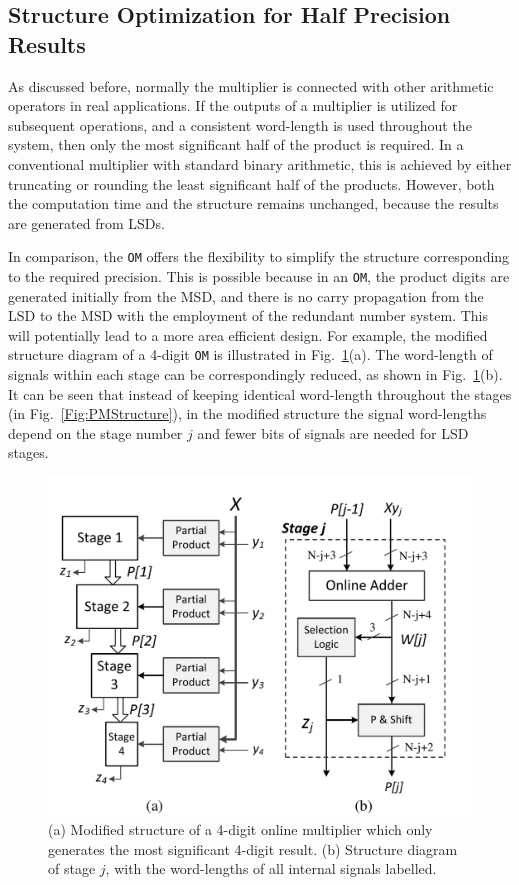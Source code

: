 \documentclass[conference]{IEEEtran}
\begin{document}
\subsection{Structure Optimization for Half Precision Results}
As discussed before, normally the multiplier is connected with other arithmetic operators in real applications. If the outputs of a multiplier is utilized for subsequent operations, and a consistent word-length is used throughout the system, then only the most significant half of the product is required. In a conventional multiplier with standard binary arithmetic, this is achieved by either truncating or rounding the least significant half of the products. However, both the computation time and the structure remains unchanged, because the results are generated from LSDs.

In comparison, the \texttt{OM} offers the flexibility to simplify the structure corresponding to the required precision. This is possible because in an \texttt{OM}, the product digits are generated initially from the MSD, and there is no carry propagation from the LSD to the MSD with the employment of the redundant number system. This will potentially lead to a more area efficient design. For example, the modified structure diagram of a 4-digit \texttt{OM} is illustrated in Fig.~\ref{Fig:PMStructure_MSDhalf}(a). The word-length of signals within each stage can be correspondingly reduced, as shown in Fig.~\ref{Fig:PMStructure_MSDhalf}(b). It can be seen that instead of keeping identical word-length throughout the stages (in Fig.~\ref{Fig:PMStructure}), in the modified structure the signal word-lengths depend on the stage number $j$ and fewer bits of signals are needed for LSD stages.

\begin{figure}[tbp]
	\centering
	\includegraphics[width=.5\textwidth]{./Figures/ParallelMult_MSDhalf.pdf}
	\caption{(a) Modified structure of a 4-digit online multiplier which only generates the most significant 4-digit result. (b) Structure diagram of stage $j$, with the word-lengths of all internal signals labelled.}
	\label{Fig:PMStructure_MSDhalf}
	\vspace{-1ex}
\end{figure}
\end{document}
